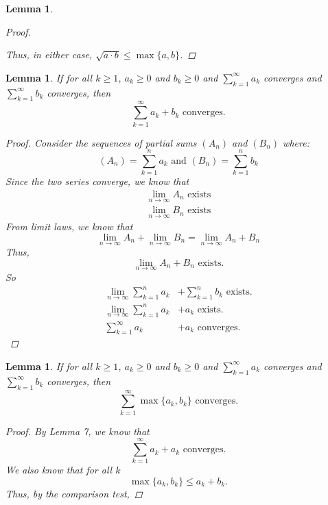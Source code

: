 \documentclass{amsart}
\newtheorem{lemma}[theorem]{Lemma}
\begin{document}
\begin{enumerate}[1.]
\begin{lemma}
\begin{proof}
\begin{enumerate}
        \end{enumerate}
        Thus, in either case, $\sqrt{a \cdot b} \leq \max\{a,b\}$.
    \end{proof}
\end{lemma}
\begin{lemma}
    If for all $k \geq 1$, $a_k \geq 0$ and $b_k \geq 0$ and $\displaystyle \sum_{k=1}^\infty a_k$ converges and $\displaystyle \sum_{k=1}^\infty b_k$ converges, then
    \[
        \displaystyle \sum_{k=1}^\infty a_k + b_k \text{ converges.}
    \]
    \begin{proof}
        Consider the sequences of partial sums $(A_n)$ and $(B_n)$ where:
        \[
            (A_n) = \displaystyle \sum_{k=1}^n a_k \text{ and } (B_n) = \displaystyle \sum_{k=1}^n b_k
        \]
        Since the two series converge, we know that 
        \begin{align*}
            \lim_{n \to \infty} A_n \text{ exists} \\
            \lim_{n \to \infty} B_n \text{ exists}
        \end{align*}
        From limit laws, we know that
        \[
            \lim_{n \to \infty} A_n +  \lim_{n \to \infty} B_n  =  \lim_{n \to \infty} A_n + B_n 
        \]
        Thus, 
        \[
            \lim_{n \to \infty} A_n + B_n \text{ exists.}    
        \]
        So 
        \begin{align*}
            \lim_{n \to \infty} \displaystyle \sum_{k=1}^n a_k &+ \displaystyle \sum_{k=1}^n b_k \text{ exists.} \\
            \lim_{n \to \infty} \displaystyle \sum_{k=1}^n a_k &+ a_k \text{ exists.} \\
            \displaystyle \sum_{k=1}^{\infty} a_k &+ a_k \text{ converges.}
        \end{align*}
    \end{proof}
\end{lemma}
\begin{lemma}
    If for all $k \geq 1$, $a_k \geq 0$ and $b_k \geq 0$ and $\displaystyle \sum_{k=1}^\infty a_k$ converges and $\displaystyle \sum_{k=1}^\infty b_k$ converges, then
    \[
        \displaystyle \sum_{k=1}^\infty \max\{a_k, b_k\} \text{ converges.}
    \]
    \begin{proof}
        By Lemma 7, we know that
        \[
            \displaystyle \sum_{k=1}^{\infty} a_k + a_k \text{ converges.}
        \]
        We also know that for all $k$
        \[
            \max\{a_k, b_k\} \leq a_k + b_k.
        \]
        Thus, by the comparison test, 

\end{proof}
\end{lemma}
\end{enumerate}
\end{document}
